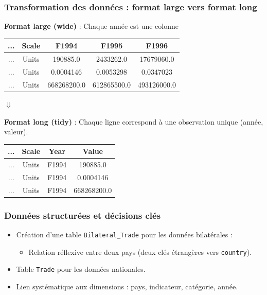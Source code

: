 \documentclass[11pt]{beamer}
\begin{document}
\begin{frame}
  \frametitle{Transformation des données : format large vers format long}

  \textbf{Format large (wide)} :\newline
  Chaque année est une colonne
  
  \begin{tabular}{|c|c|c|c|c|}
    \hline
    ... & Scale & F1994 & F1995 & F1996 \\
    \hline
    ... & Units & 190885.0 & 2433262.0 & 17679060.0 \\
    ... & Units & 0.0004146 & 0.0053298 & 0.0347023 \\
    ... & Units & 668268200.0 & 612865500.0 & 493126000.0 \\
    \hline
  \end{tabular}

  \vspace{1em}
  \centering
  $\Downarrow$
  \vspace{1em}

  \raggedright
  \textbf{Format long (tidy)} :\newline
  Chaque ligne correspond à une observation unique (année, valeur).

  \begin{tabular}{|c|c|c|c|}
    \hline
    ... & Scale & Year & Value \\
    \hline
    ... & Units & F1994 & 190885.0 \\
    ... & Units & F1994 & 0.0004146 \\
    ... & Units & F1994 & 668268200.0 \\
    \hline
  \end{tabular}

\end{frame}



\begin{frame}
  \frametitle{Données structurées et décisions clés}
  \begin{itemize}
    \item<1-> Création d'une table \texttt{Bilateral\_Trade} pour les données bilatérales :
    \begin{itemize}
      \item Relation réflexive entre deux pays (deux clés étrangères vers \texttt{country}).
    \end{itemize}
    \item<2-> Table \texttt{Trade} pour les données nationales.
    \item<3-> Lien systématique aux dimensions : pays, indicateur, catégorie, année.
  \end{itemize}
\end{frame}
\end{document}
